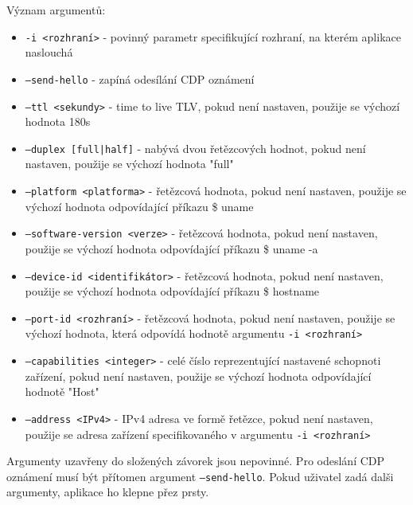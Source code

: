 \documentclass[a4paper,12pt]{article}
\begin{document}
		Význam argumentů: 
		\begin{itemize}
			\item \texttt{-i <rozhraní>} - povinný parametr specifikující rozhraní, na kterém aplikace naslouchá
			\item \texttt{--send-hello} - zapíná odesílání CDP oznámení
			\item \texttt{--ttl <sekundy>} - time to live TLV, pokud není nastaven, použije se výchozí hodnota 180s
			\item \texttt{--duplex [full|half]} - nabývá dvou řetězcových hodnot, pokud není nastaven, použije se výchozí hodnota "full"
			\item \texttt{--platform <platforma>} - řetězcová hodnota, pokud není nastaven, použije se výchozí hodnota odpovídající příkazu \$ uname
			\item \texttt{--software-version <verze>} - řetězcová hodnota, pokud není nastaven, použije se výchozí hodnota odpovídající příkazu \$ uname -a
			\item \texttt{--device-id <identifikátor>} - řetězcová hodnota, pokud není nastaven, použije se výchozí hodnota odpovídající příkazu \$ hostname
			\item \texttt{--port-id <rozhraní>} - řetězcová hodnota, pokud není nastaven, použije se výchozí hodnota, která odpovídá hodnotě argumentu \texttt{-i <rozhraní>}
			\item \texttt{--capabilities <integer>} - celé číslo reprezentující nastavené schopnoti zařízení, pokud není nastaven, použije se výchozí hodnota odpovídající hodnotě "Host"
			\item \texttt{--address <IPv4>} - IPv4 adresa ve formě řetězce, pokud není nastaven, použije se adresa zařízení specifikovaného v argumentu \texttt{-i <rozhraní>}  
		\end{itemize}
		
		Argumenty uzavřeny do složených závorek jsou nepovinné. Pro odeslání CDP oznámení musí být přítomen argument \texttt{--send-hello}. Pokud uživatel zadá dalši argumenty, aplikace ho klepne přez prsty.
			
	\pagebreak	
	\listoffigures
	\listoftables
	\pagebreak

	
	
\end{document}
